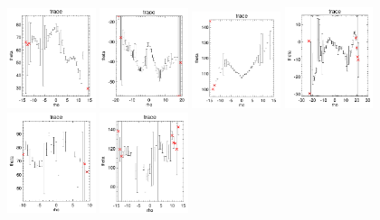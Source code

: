 \documentclass[fleqn,usenatbib]{mnras}
\begin{document}
\begin{figure}
    \includegraphics[width=0.23\textwidth]{Images/trace-plots/trace-plots-cpsbs/8315-3703.png}
    \includegraphics[width=0.23\textwidth]{Images/trace-plots/trace-plots-cpsbs/8331-6104.png}
    \includegraphics[width=0.23\textwidth]{Images/trace-plots/trace-plots-cpsbs/8555-3701.png}
    \includegraphics[width=0.23\textwidth]{Images/trace-plots/trace-plots-cpsbs/8623-9102.png}
    \includegraphics[width=0.23\textwidth]{Images/trace-plots/trace-plots-cpsbs/8655-1902.png}
    \includegraphics[width=0.23\textwidth]{Images/trace-plots/trace-plots-cpsbs/8713-3701.png}

\end{figure}
\end{document}
